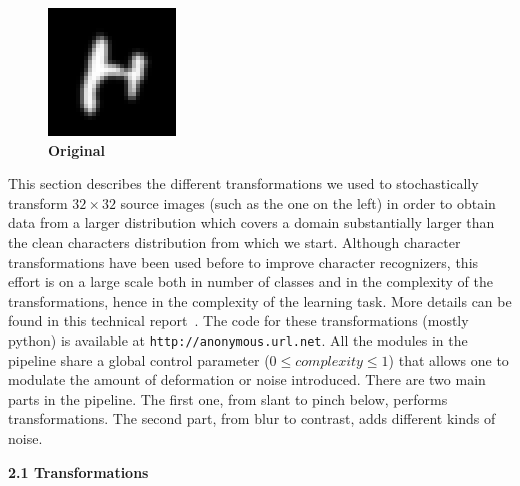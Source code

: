 \documentclass{article} %
\begin{document}
\begin{figure}
\vspace*{-5mm}
\begin{center}
\includegraphics[scale=.4]{images/Original.png}\\
{\bf Original}
\end{center}
\end{figure}
This section describes the different transformations we used to stochastically
transform $32 \times 32$ source images (such as the one on the left)
in order to obtain data from a larger distribution which
covers a domain substantially larger than the clean characters distribution from
which we start. 
Although character transformations have been used before to
improve character recognizers, this effort is on a large scale both
in number of classes and in the complexity of the transformations, hence
in the complexity of the learning task.
More details can
be found in this technical report~\citep{ift6266-tr-anonymous}.
The code for these transformations (mostly python) is available at 
{\tt http://anonymous.url.net}. All the modules in the pipeline share
a global control parameter ($0 \le complexity \le 1$) that allows one to modulate the
amount of deformation or noise introduced. 
There are two main parts in the pipeline. The first one,
from slant to pinch below, performs transformations. The second
part, from blur to contrast, adds different kinds of noise.

\vspace*{1mm}
{\large\bf 2.1 Transformations}
\vspace*{1mm}
\end{document}
